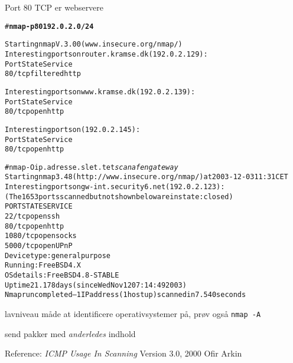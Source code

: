 \documentclass[20pt,landscape,a4paper,footrule]{foils}
\begin{document}

\begin{list1}
  \item Port 80 TCP er webservere
\end{list1}

\begin{alltt}
\small # {\bfseries nmap  -p 80 192.0.2.0/24}

Starting nmap V. 3.00 ( www.insecure.org/nmap/ )
Interesting ports on router.kramse.dk (192.0.2.129):
Port       State       Service
80/tcp     filtered    http

Interesting ports on www.kramse.dk (192.0.2.139):
Port       State       Service
80/tcp     open        http

Interesting ports on  (192.0.2.145):
Port       State       Service
80/tcp     open        http

\end{alltt}


\begin{alltt}
\footnotesize
# nmap -O ip.adresse.slet.tet \emph{scan af en gateway}
Starting nmap 3.48 ( http://www.insecure.org/nmap/ ) at 2003-12-03 11:31 CET
Interesting ports on gw-int.security6.net (192.0.2.123):
(The 1653 ports scanned but not shown below are in state: closed)
PORT     STATE SERVICE
22/tcp   open  ssh
80/tcp   open  http
1080/tcp open  socks
5000/tcp open  UPnP
Device type: general purpose
Running: FreeBSD 4.X
OS details: FreeBSD 4.8-STABLE
Uptime 21.178 days (since Wed Nov 12 07:14:49 2003)
Nmap run completed -- 1 IP address (1 host up) scanned in 7.540 seconds
\end{alltt}

\begin{list2}
\item lavniveau måde at identificere operativsystemer på, prøv også
  \verb+nmap -A+
\item send pakker med \emph{anderledes} indhold
\item Reference: \emph{ICMP Usage In Scanning} Version 3.0, 2000
  Ofir Arkin\\ 
\end{list2}



\centerline{}
\end{document}
